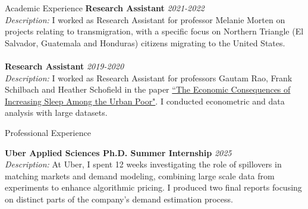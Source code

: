 \documentclass{resume} %
\begin{document}
\begin{rSection}{Academic Experience}
{\bf Research Assistant} \hfill {\em 2021-2022} \\
{\it Description:} I worked as Research Assistant for professor Melanie Morten on projects relating to transmigration, with a specific focus on Northern Triangle (El Salvador, Guatemala and Honduras) citizens migrating to the United States. \\ \\
{\bf Research Assistant} \hfill {\em 2019-2020} \\
{\it Description:} I worked as Research Assistant for professors Gautam Rao, Frank Schilbach and Heather Schofield in the paper  \href{https://economics.mit.edu/sites/default/files/2022-09/economic-sleep-qje.pdf}{``The Economic Consequences of
Increasing Sleep Among the Urban Poor"}. I conducted econometric and data analysis with large datasets.
\end{rSection}


\begin{rSection}{Professional Experience}

\smallskip
{\bf Uber Applied Sciences Ph.D. Summer Internship} \hfill {\em 2025} \\
{\it Description:} At Uber, I spent 12 weeks investigating the role of spillovers in matching markets and demand modeling, combining large scale data from experiments to enhance algorithmic pricing. I produced two final reports focusing on distinct parts of the company's demand estimation process.

\end{rSection}
\end{document}
